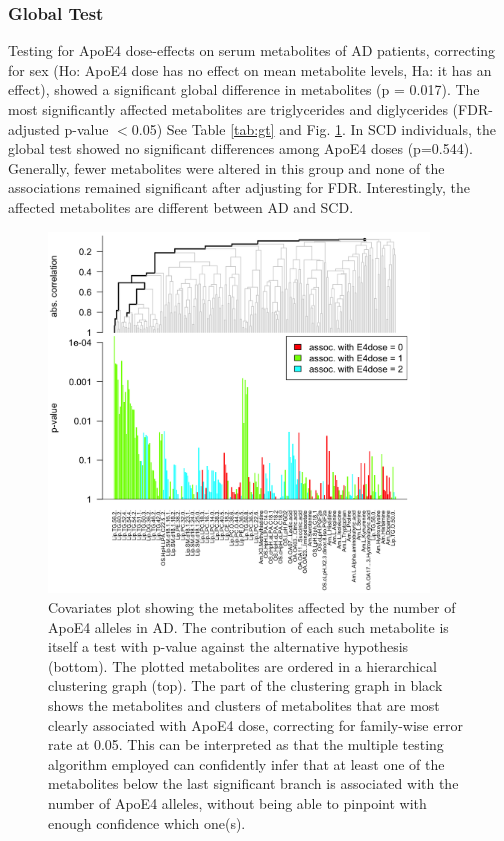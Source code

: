 \documentclass{amsart}
\begin{document}
\subsubsection{Global Test}
Testing for ApoE4 dose-effects on serum metabolites of AD patients, correcting for sex (Ho: ApoE4 dose has no effect on mean metabolite levels, Ha: it has an effect), showed a significant global difference in metabolites (p = 0.017). The most significantly affected metabolites are triglycerides and diglycerides (FDR-adjusted p-value $<$0.05) See Table \ref{tab:gt} and Fig. \ref{plot:gt}. In SCD individuals, the global test showed no significant differences among ApoE4 doses (p=0.544). Generally, fewer metabolites were altered in this group and none of the associations remained significant after adjusting for FDR. Interestingly, the affected metabolites are different between AD and SCD.
\begin{figure}[H]
  \includegraphics[width=0.9\textwidth]{figures/gt2.png}
    \caption{Covariates plot showing the metabolites affected by the number of ApoE4 alleles in AD. The contribution of each such metabolite is itself a test with p-value against the alternative hypothesis (bottom). The plotted metabolites are ordered in a hierarchical clustering graph (top). The part of the clustering graph in black shows the metabolites and clusters of metabolites that are most clearly associated with ApoE4 dose, correcting for family-wise error rate at 0.05. This can be interpreted as that the multiple testing algorithm employed can confidently infer that at least one of the metabolites below the last significant branch is associated with the number of ApoE4 alleles, without being able to pinpoint with enough confidence which one(s).\vspace{-100pt}}
  \label{plot:gt}
\end{figure}
\end{document}
